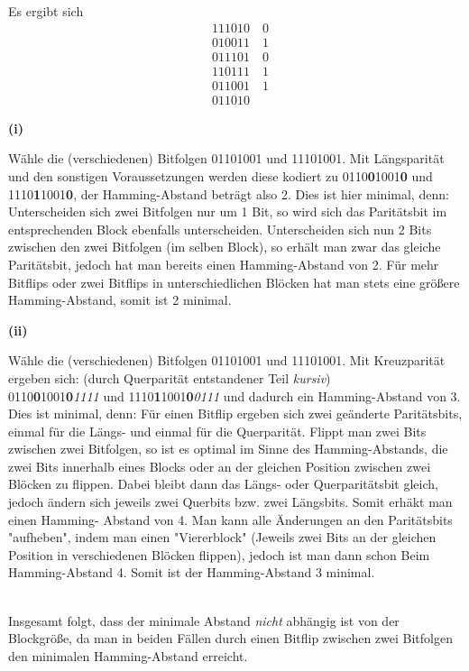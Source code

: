 \documentclass{../exercisesheet}
\begin{document}
\begin{exercise}{2.5}
	\begin{subexercise}
	Es ergibt sich
		\begin{equation*}
		\begin{split}
		&111010 \quad 0 \\
		&010011 \quad 1 \\
		&011101 \quad 0 \\
		&110111 \quad 1 \\
		&011001 \quad 1 \\[1em]
		&011010
		\end{split}
		\end{equation*}
	\end{subexercise}

	\begin{subexercise}
	\textbf{(i)}
	\begin{adjustwidth}{10pt}{10pt}
	Wähle die (verschiedenen) Bitfolgen 01101001 und 11101001. Mit Längsparität und den sonstigen Voraussetzungen werden diese kodiert zu
	0110\textbf{0}1001\textbf{0} und 1110\textbf{1}1001\textbf{0}, der Hamming-Abstand beträgt also 2. Dies ist hier minimal, denn: Unterscheiden sich
	zwei Bitfolgen nur um 1 Bit, so wird sich das Paritätsbit im entsprechenden Block ebenfalls unterscheiden. Unterscheiden sich nun 2 Bits zwischen den
	zwei Bitfolgen (im selben Block), so erhält man zwar das gleiche Paritätsbit, jedoch hat man bereits einen Hamming-Abstand von 2. Für mehr Bitflips
	oder zwei Bitflips in unterschiedlichen Blöcken hat man stets eine größere Hamming-Abstand, somit ist 2 minimal.
	\end{adjustwidth}
	\textbf{(ii)}
	\begin{adjustwidth}{10pt}{10pt}
	Wähle die (verschiedenen) Bitfolgen 01101001 und 11101001. Mit Kreuzparität ergeben sich: (durch Querparität entstandener Teil \textit{kursiv})\\
	0110\textbf{0}1001\textbf{0}\textit{1111} und 1110\textbf{1}1001\textbf{0}\textit{0111} und dadurch ein Hamming-Abstand von 3. Dies ist minimal,
	denn: Für einen Bitflip ergeben sich zwei geänderte Paritätsbits, einmal für die Längs- und einmal für die Querparität. Flippt man zwei Bits zwischen zwei
	Bitfolgen, so ist es optimal im Sinne des Hamming-Abstands, die zwei Bits innerhalb eines Blocks oder an der gleichen Position zwischen zwei Blöcken zu
	flippen. Dabei bleibt dann das Längs- oder Querparitätsbit gleich, jedoch ändern sich jeweils zwei Querbits bzw. zwei Längsbits. Somit erhäkt man einen Hamming-
	Abstand von 4. Man kann alle Änderungen an den Paritätsbits "aufheben", indem man einen "Viererblock" (Jeweils zwei Bits an der gleichen Position in
	verschiedenen Blöcken flippen), jedoch ist man dann schon Beim Hamming-Abstand 4. Somit ist der Hamming-Abstand 3 minimal.
	\end{adjustwidth}\ \\
	Insgesamt folgt, dass der minimale Abstand \textit{nicht} abhängig ist von der Blockgröße, da man in beiden Fällen durch einen Bitflip zwischen zwei
	Bitfolgen den minimalen Hamming-Abstand erreicht.
	\end{subexercise}
\end{exercise}
\end{document}
